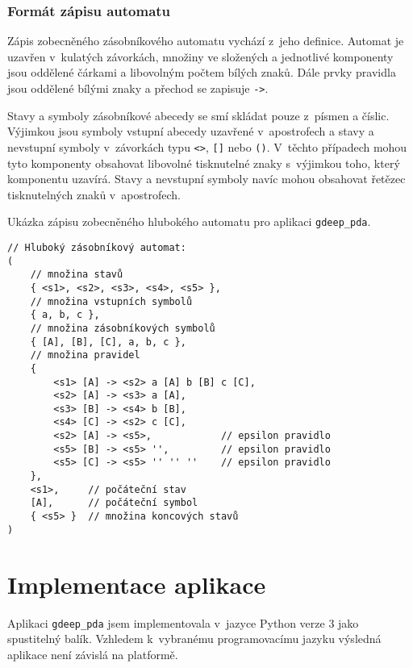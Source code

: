 \subsubsection{Formát zápisu automatu}\label{kap_aplikace_format}

Zápis zobecněného zásobníkového automatu vychází z~jeho definice. Automat je uzavřen v~kulatých závorkách, množiny ve složených a jednotlivé komponenty jsou oddělené čárkami a libovolným počtem bílých znaků. Dále prvky pravidla jsou oddělené bílými znaky a přechod se zapisuje \texttt{->}. 

Stavy a symboly zásobníkové abecedy se smí skládat pouze z~písmen a číslic. Výjimkou jsou symboly vstupní abecedy uzavřené v~apostrofech a stavy a nevstupní symboly v~závorkách typu \texttt{<>}, \texttt{[]} nebo \texttt{()}. V~těchto případech mohou tyto komponenty obsahovat libovolné tisknutelné znaky s~výjimkou toho, který komponentu uzavírá. Stavy a nevstupní symboly navíc mohou obsahovat řetězec tisknutelných znaků v~apostrofech.


\begin{Example} \label{example_format}
Ukázka zápisu zobecněného hlubokého automatu pro aplikaci \texttt{gdeep\_pda}.

\begin{verbatim}
// Hluboký zásobníkový automat:
(
    // množina stavů
    { <s1>, <s2>, <s3>, <s4>, <s5> },
    // množina vstupních symbolů
    { a, b, c },
    // množina zásobníkových symbolů
    { [A], [B], [C], a, b, c },
    // množina pravidel
    { 
        <s1> [A] -> <s2> a [A] b [B] c [C],
        <s2> [A] -> <s3> a [A],
        <s3> [B] -> <s4> b [B],
        <s4> [C] -> <s2> c [C],
        <s2> [A] -> <s5>,            // epsilon pravidlo
        <s5> [B] -> <s5> '',         // epsilon pravidlo
        <s5> [C] -> <s5> '' '' ''    // epsilon pravidlo
    },
    <s1>,     // počáteční stav
    [A],      // počáteční symbol
    { <s5> }  // množina koncových stavů	
)
\end{verbatim}
\end{Example}

\section{Implementace aplikace}

Aplikaci \texttt{gdeep\_pda} jsem implementovala v~jazyce Python verze 3 jako spustitelný balík. Vzhledem k~vybranému programovacímu jazyku výsledná aplikace není závislá na platformě.


